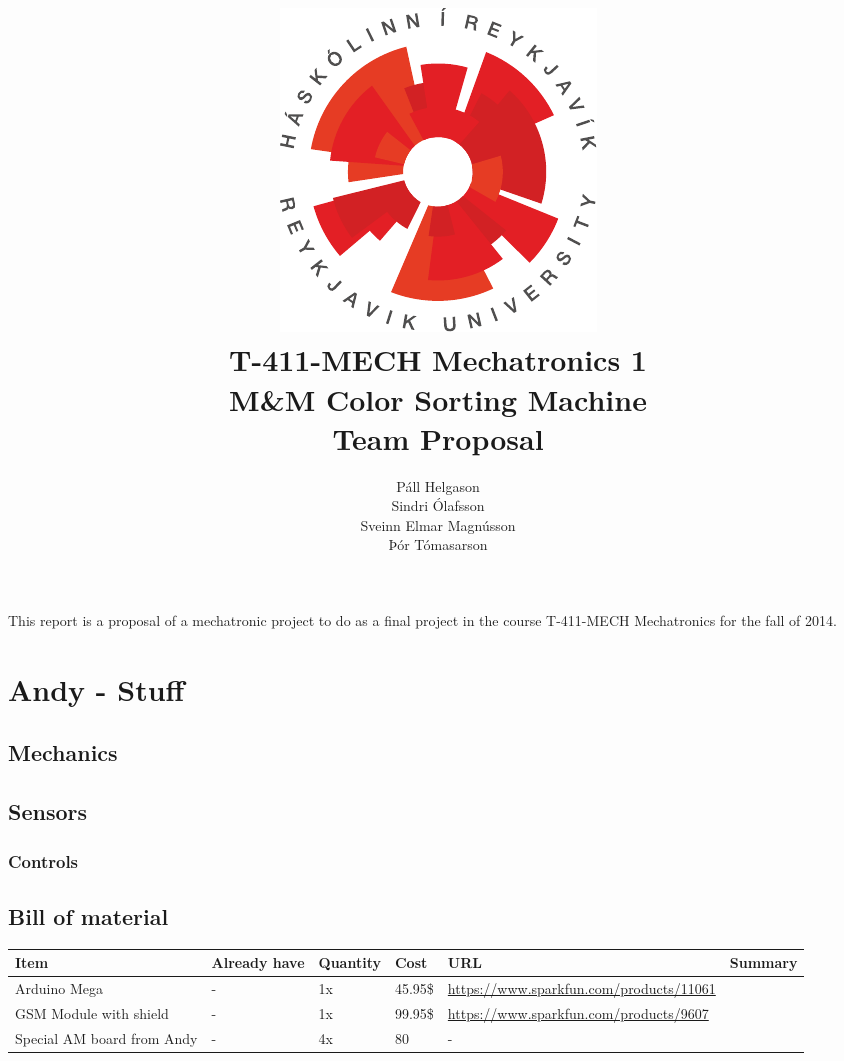\documentclass[12pt,a4paper,titlepage]{article}
\author{Páll Helgason\\Sindri Ólafsson\\Sveinn Elmar Magnússon\\Þór Tómasarson}  %
\title{\includegraphics{graphics/ru-logo}\\\vspace{10mm}
T-411-MECH Mechatronics 1\\M\&M Color Sorting Machine\\Team Proposal}  %
\begin{document}
\maketitle  %
\onehalfspacing %

This report is a proposal of a mechatronic project to do as a
final project in the course T-411-MECH Mechatronics for the fall of 2014.
 

\section{Andy - Stuff}



\subsection{Mechanics} 


\subsection{Sensors}


\subsubsection{Controls} 
 

\subsection{Bill of material} %
\begin{center}
    \begin{tabular}{ | p{1.5cm} | p{1.4cm} | p{1.5cm} | l | p{5.5cm} | p{5cm} |}
    \hline
    Item & Already have & Quantity & Cost & URL & Summary \\ \hline
    
    Arduino Mega & - & 1x & 45.95\$ & \url{https://www.sparkfun.com/products/11061} &  \\ \hline
    
    GSM Module with shield & - & 1x & 99.95\$ & \url{https://www.sparkfun.com/products/9607} &  \\ \hline
    
	Special AM board from Andy & - & 4x & 80 & - &  \\ \hline
    \end{tabular}
\end{center}
 






\end{document}
